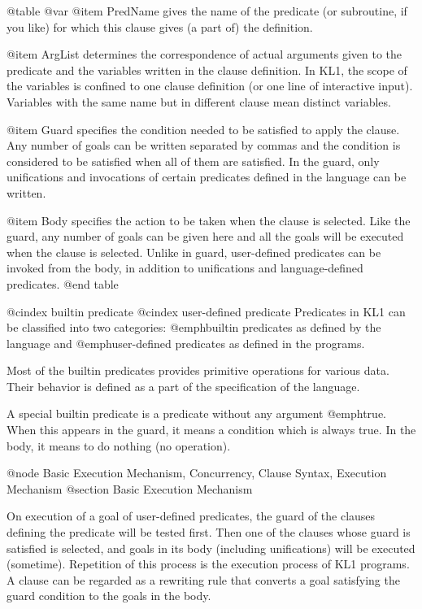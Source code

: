 @table @var
@item PredName
gives the name of the predicate (or subroutine, if you like) for which
this clause gives (a part of) the definition.

@item ArgList
determines the correspondence of actual arguments given to the
predicate and the variables written in the clause definition.  In KL1,
the scope of the variables is confined to one clause definition (or
one line of interactive input).  Variables with the same name but in
different clause mean distinct variables.

@item Guard
specifies the condition needed to be satisfied to apply the clause.
Any number of goals can be written separated by commas and the condition
is considered to be satisfied when all of them are satisfied.  In the
guard, only unifications and invocations of certain predicates defined
in the language can be written.

@item Body
specifies the action to be taken when the clause is selected.  Like
the guard, any number of goals can be given here and all the goals
will be executed when the clause is selected.  Unlike in guard,
user-defined predicates can be invoked from the body, in addition to
unifications and language-defined predicates.
@end table

@cindex builtin predicate
@cindex user-defined predicate
Predicates in KL1 can be classified into two categories: @emph{builtin
predicates} as defined by the language and @emph{user-defined
predicates} as defined in the programs.

Most of the builtin predicates provides primitive operations for
various data.  Their behavior is defined as a part of the
specification of the language.

A special builtin predicate is a predicate without any argument
@emph{true}.  When this appears in the guard, it means a condition which
is always true.  In the body, it means to do nothing (no operation).

@node Basic Execution Mechanism, Concurrency, Clause Syntax, Execution Mechanism
@section Basic Execution Mechanism

On execution of a goal of user-defined predicates, the guard of the
clauses defining the predicate will be tested first.  Then one of the
clauses whose guard is satisfied is selected, and goals in its body
(including unifications) will be executed (sometime).  Repetition of
this process is the execution process of KL1 programs.  A clause can be
regarded as a rewriting rule that converts a goal satisfying the guard
condition to the goals in the body.

